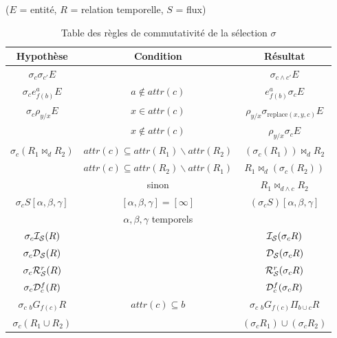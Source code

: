 \begin{table}[p]
\centering
($E$ = entité, $R$ = relation temporelle, $S$ = flux)
\begin{tabular}{|c|c|c|} \bottomrule
\rowcolor{hypcolor} Hypothèse & Condition & Résultat \\ \hline
    $\sigma_c \sigma_{c'} E$ & & $\sigma_{c\wedge c'} E$ \\ \hline
    $\sigma_c e_{f(b)}^a E$ & $a \not\in attr(c)$ & $e_{f(b)}^a \sigma_c E$ \\ \hline
    \multirow{2}{*}{$\sigma_c \rho_{y/x} E$} & $x \in attr(c)$ & $\rho_{y/x}\sigma_{\textrm{replace}(x,y,c)}  E$ \\ \cline{2-3}
    & $x\not\in attr(c)$ & $\rho_{y/x}\sigma_c E$ \\ \hline
    \multirow{3}{*}{$\sigma_c(R_1\Join_d R_2)$} & $attr(c)\subseteq attr(R_1)\backslash attr(R_2)$ & $(\sigma_c(R_1)) \Join_d R_2$  \\ \cline{2-3}
    & $attr(c)\subseteq attr(R_2)\backslash attr(R_1)$ & $R_1 \Join_d (\sigma_c(R_2))$ \\ \cline{2-3}
    & sinon & $R_1 \Join_{d \wedge c} R_2$  \\ \hline
    \multirow{2}{*}{$\sigma_c S[\alpha,\beta,\gamma]$} & $[\alpha,\beta,\gamma]=[\infty]$ & \multirow{2}{*}{$(\sigma_c S)[\alpha,\beta,\gamma]$} \\ \cline{2-2}
     & $\alpha,\beta,\gamma$ temporels & \\ \hline
    $\sigma_c \mathcal{I_S}(R)$ &  & $\mathcal{I_S}(\sigma_c R)$ \\ \hline
    $\sigma_c \mathcal{D_S}(R)$ &  & $\mathcal{D_S}(\sigma_c R)$ \\ \hline
    $\sigma_c \mathcal{R}_{\mathcal S}^{r}(R)$ & & $\mathcal{R}_{\mathcal S}^{r}(\sigma_c R)$ \\ \hline
    $\sigma_c \mathcal{D}_c^f(R)$ & & $\mathcal{D}_c^f(\sigma_c R)$ \\ \hline
    $\sigma_c \ {}_{b} G_{f(c)} R$ & $attr(c)\subseteq b$ & $\sigma_c\  {}_{b} G_{f(c)}  \Pi_{b \cup c} R$ \\ \hline
    $\sigma_c (R_1\cup R_2)$ & &  $(\sigma_c R_1)\cup (\sigma_c R_2)$  \\ \toprule
\end{tabular}
\caption{Table des règles de commutativité de la sélection $\sigma$}\label{tab:selection}
\end{table}


